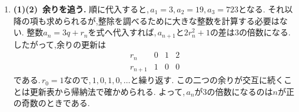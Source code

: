 \begin{enumerate}[label=\textbf{問\arabic*.},leftmargin=3.8em,format=\bookitemlink{practice-bridge}{solution}{problem}]
                \smallskip
                \textbf{(3)~隣接3項型へ.}
                チャートの「項数と添字の間隔」に沿って
                \[
                  t^2-t-1=0
                \]
                を作る.異なる二つの根は$\displaystyle \alpha,\beta$であるから,
                \[
                  c_n=A\alpha^n+B\beta^n
                \]
                と書ける.\,$\displaystyle c_0=1,c_1=2$を代入すると,
                \[
                  A=\frac{\alpha^2}{\sqrt5},\qquad
                  B=-\frac{\beta^2}{\sqrt5}
                \]
                となり,解答の式を得る.
                根に無理数が現れても,数えているものが文字列の個数なので,得られる値は整数である.
          \item \textbf{(1)(2)~余りを追う.}
                順に代入すると,\,$\displaystyle a_1=3,a_2=19,a_3=723$となる.
                それ以降の項も求められるが,整除を調べるために大きな整数を計算する必要はない.
                整数$\displaystyle a_n=3q+r_n$を式へ代入すれば,\,$\displaystyle a_{n+1}$と$\displaystyle 2r_n^2+1$の差は$\displaystyle 3$の倍数になる.
                したがって,余りの更新は
                \[
                  \begin{array}{c|ccc}
                    r_n&0&1&2\\ \hline
                    r_{n+1}&1&0&0
                  \end{array}
                \]
                である.\,$\displaystyle r_0=1$なので,\,$\displaystyle 1,0,1,0,\ldots$と繰り返す.
                この二つの余りが交互に続くことは更新表から帰納法で確かめられる.
                よって,\,$\displaystyle a_n$が$\displaystyle 3$の倍数になるのは$\displaystyle n$が正の奇数のときである.


\end{enumerate}
